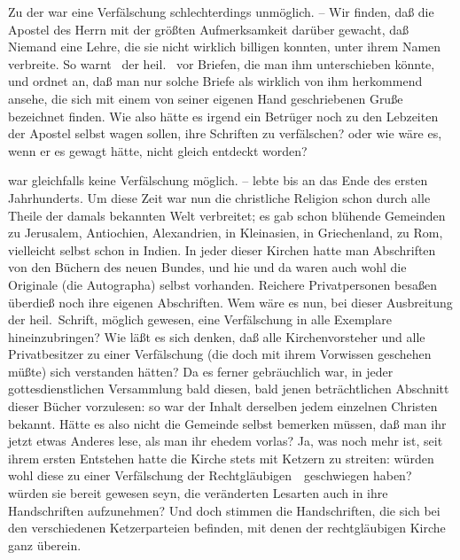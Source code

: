 \begin{aufza}[1)]
\item Zu der  war eine Verfälschung schlechterdings unmöglich. -- Wir finden, daß die Apostel des Herrn mit der größten Aufmerksamkeit darüber gewacht, daß Niemand eine Lehre, die sie nicht wirklich billigen konnten, unter ihrem Namen verbreite. So warnt \zB\ der heil.\  vor Briefen, die man ihm unterschieben könnte, und ordnet an, daß man nur solche Briefe als wirklich von ihm herkommend ansehe, die sich mit einem von seiner eigenen Hand geschriebenen Gruße bezeichnet finden. Wie also hätte es irgend ein Betrüger noch zu den Lebzeiten der Apostel selbst wagen sollen, ihre Schriften zu verfälschen? oder wie wäre es, wenn er es gewagt hätte, nicht gleich entdeckt worden?
\item {} war gleichfalls keine Verfälschung möglich. --  lebte bis an das Ende des ersten Jahrhunderts. Um diese Zeit war nun die christliche Religion schon durch alle Theile der damals bekannten Welt verbreitet; es gab schon blühende Gemeinden zu Jerusalem, Antiochien, Alexandrien, in Kleinasien, in Griechenland, zu Rom, vielleicht selbst schon in Indien. In jeder dieser Kirchen hatte man Abschriften von den Büchern des neuen Bundes, und hie und da waren auch wohl die Originale (die Autographa) selbst vorhanden. Reichere Privatpersonen besaßen überdieß noch ihre eigenen Abschriften. Wem wäre es nun, bei dieser Ausbreitung der heil.\ Schrift, möglich gewesen, eine Verfälschung in alle Exemplare hineinzubringen? Wie läßt es sich denken, daß alle Kirchenvorsteher und alle Privatbesitzer zu einer Verfälschung (die doch mit ihrem Vorwissen geschehen müßte) sich verstanden hätten? Da es ferner gebräuchlich war, in jeder gottesdienstlichen Versammlung bald diesen, bald jenen beträchtlichen Abschnitt dieser Bücher vorzulesen: so war der Inhalt derselben jedem einzelnen Christen bekannt. Hätte es also nicht die Gemeinde selbst bemerken müssen, daß man ihr jetzt etwas Anderes lese, als man ihr ehedem vorlas? Ja, was noch mehr ist, seit ihrem ersten Entstehen hatte die Kirche stets mit Ketzern zu streiten: würden wohl diese zu einer Verfälschung der Rechtgläubigen~\ geschwiegen haben? würden sie bereit gewesen seyn, die veränderten Lesarten auch in ihre Handschriften aufzunehmen? Und doch stimmen die Handschriften, die sich bei den verschiedenen Ketzerparteien befinden, mit denen der rechtgläubigen Kirche ganz überein.

\end{aufza}
